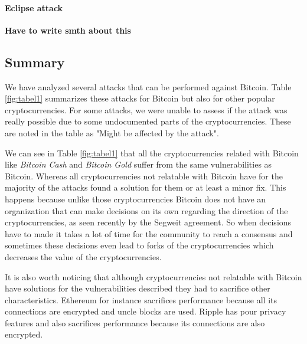 \paragraph{Eclipse attack}
\textbf{Have to write smth about this}



\subsection{Summary}
We have analyzed several attacks that can be performed against Bitcoin. Table \ref{fig:tabel1} summarizes these attacks for Bitcoin but also for other popular cryptocurrencies. For some attacks, we were unable to assess if the attack was really possible due to some undocumented parts of the cryptocurrencies. These are noted in the table as "Might be affected by the attack".

We can see in Table \ref{fig:tabel1} that all the cryptocurrencies related with Bitcoin like \textit{Bitcoin Cash} and \textit{Bitcoin Gold} suffer from the same vulnerabilities as Bitcoin. Whereas all cryptocurrencies not relatable with Bitcoin have for the majority of the attacks found a solution for them or at least a minor fix. This happens because unlike those cryptocurrencies Bitcoin does not have an organization that can make decisions on its own regarding the direction of the cryptocurrencies, as seen recently by the Segweit agreement. So when decisions have to made it takes a lot of time for the community to reach a consensus and sometimes these decisions even lead to forks of the cryptocurrencies which decreases the value of the cryptocurrencies.

It is also worth noticing that although cryptocurrencies not relatable with Bitcoin have solutions for the vulnerabilities described they had to sacrifice other characteristics. Ethereum for instance sacrifices performance because all its connections are encrypted and uncle blocks are used. Ripple has pour privacy features and also sacrifices performance because its connections are also encrypted.

